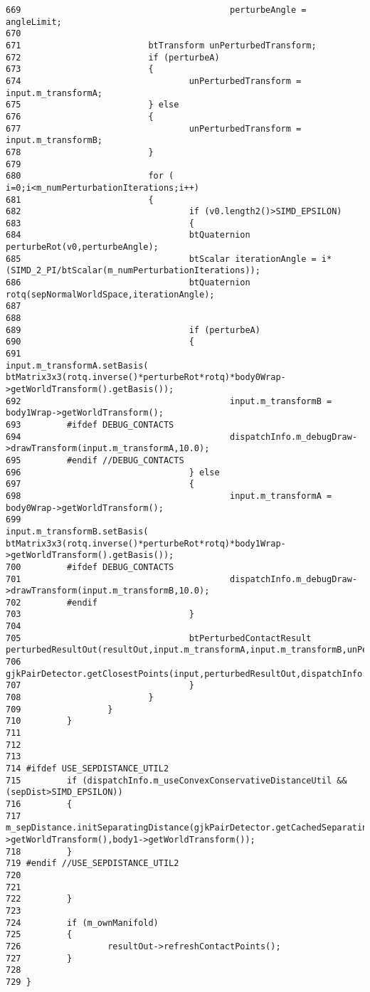 \begin{Code}
\begin{verbatim}
669                                         perturbeAngle = angleLimit;
670 
671                         btTransform unPerturbedTransform;
672                         if (perturbeA)
673                         {
674                                 unPerturbedTransform = input.m_transformA;
675                         } else
676                         {
677                                 unPerturbedTransform = input.m_transformB;
678                         }
679                         
680                         for ( i=0;i<m_numPerturbationIterations;i++)
681                         {
682                                 if (v0.length2()>SIMD_EPSILON)
683                                 {
684                                 btQuaternion perturbeRot(v0,perturbeAngle);
685                                 btScalar iterationAngle = i*(SIMD_2_PI/btScalar(m_numPerturbationIterations));
686                                 btQuaternion rotq(sepNormalWorldSpace,iterationAngle);
687                                 
688                                 
689                                 if (perturbeA)
690                                 {
691                                         input.m_transformA.setBasis(  btMatrix3x3(rotq.inverse()*perturbeRot*rotq)*body0Wrap->getWorldTransform().getBasis());
692                                         input.m_transformB = body1Wrap->getWorldTransform();
693         #ifdef DEBUG_CONTACTS
694                                         dispatchInfo.m_debugDraw->drawTransform(input.m_transformA,10.0);
695         #endif //DEBUG_CONTACTS
696                                 } else
697                                 {
698                                         input.m_transformA = body0Wrap->getWorldTransform();
699                                         input.m_transformB.setBasis( btMatrix3x3(rotq.inverse()*perturbeRot*rotq)*body1Wrap->getWorldTransform().getBasis());
700         #ifdef DEBUG_CONTACTS
701                                         dispatchInfo.m_debugDraw->drawTransform(input.m_transformB,10.0);
702         #endif
703                                 }
704                                 
705                                 btPerturbedContactResult perturbedResultOut(resultOut,input.m_transformA,input.m_transformB,unPerturbedTransform,perturbeA,dispatchInfo.m_debugDraw);
706                                 gjkPairDetector.getClosestPoints(input,perturbedResultOut,dispatchInfo.m_debugDraw);
707                                 }
708                         }
709                 }
710         }
711 
712         
713 
714 #ifdef USE_SEPDISTANCE_UTIL2
715         if (dispatchInfo.m_useConvexConservativeDistanceUtil && (sepDist>SIMD_EPSILON))
716         {
717                 m_sepDistance.initSeparatingDistance(gjkPairDetector.getCachedSeparatingAxis(),sepDist,body0->getWorldTransform(),body1->getWorldTransform());
718         }
719 #endif //USE_SEPDISTANCE_UTIL2
720 
721 
722         }
723 
724         if (m_ownManifold)
725         {
726                 resultOut->refreshContactPoints();
727         }
728 
729 }
\end{verbatim}
\end{Code}




